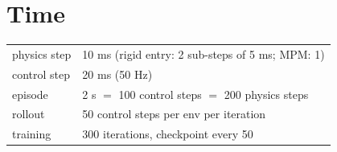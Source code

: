 \section*{Time}
\begin{center}
\small
\begin{tabular}{@{}ll@{}}
\toprule
physics step & 10 ms (rigid entry: 2 sub-steps of 5 ms; MPM: 1) \\
control step & 20 ms (50 Hz) \\
episode & 2 s $=$ 100 control steps $=$ 200 physics steps \\
rollout & 50 control steps per env per iteration \\
training & 300 iterations, checkpoint every 50 \\
\bottomrule
\end{tabular}
\end{center}
